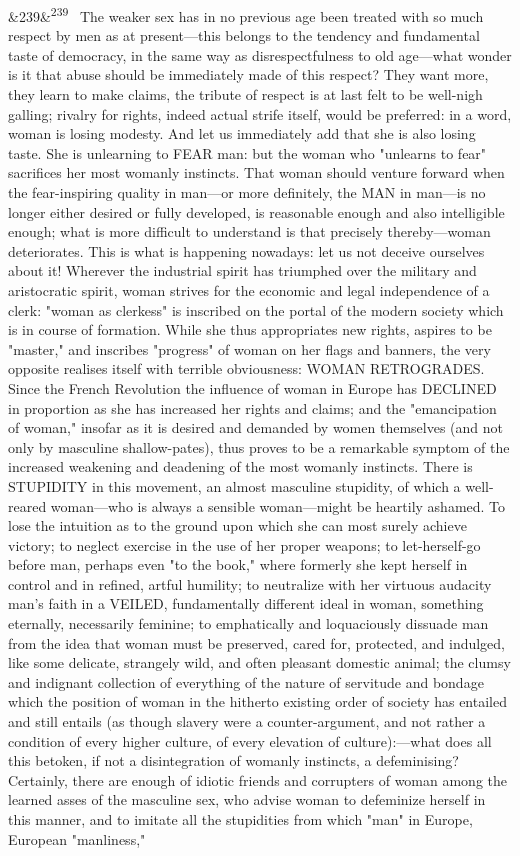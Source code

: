 \documentclass[12pt]{article}
\newcommand{\para}[1][]{\par\noindent\ifx&#1&\else\textsuperscript{\footnotesize #1}~\fi}
\begin{document}
\para[239] The weaker sex has in no previous age been treated with so much respect by men as at present---this belongs to the tendency and fundamental taste of democracy, in the same way as disrespectfulness to old age---what wonder is it that abuse should be immediately made of this respect? They want more, they learn to make claims, the tribute of respect is at last felt to be well-nigh galling; rivalry for rights, indeed actual strife itself, would be preferred: in a word, woman is losing modesty. And let us immediately add that she is also losing taste. She is unlearning to FEAR man: but the woman who "unlearns to fear" sacrifices her most womanly instincts. That woman should venture forward when the fear-inspiring quality in man---or more definitely, the MAN in man---is no longer either desired or fully developed, is reasonable enough and also intelligible enough; what is more difficult to understand is that precisely thereby---woman deteriorates. This is what is happening nowadays: let us not deceive ourselves about it! Wherever the industrial spirit has triumphed over the military and aristocratic spirit, woman strives for the economic and legal independence of a clerk: "woman as clerkess" is inscribed on the portal of the modern society which is in course of formation. While she thus appropriates new rights, aspires to be "master," and inscribes "progress" of woman on her flags and banners, the very opposite realises itself with terrible obviousness: WOMAN RETROGRADES. Since the French Revolution the influence of woman in Europe has DECLINED in proportion as she has increased her rights and claims; and the "emancipation of woman," insofar as it is desired and demanded by women themselves (and not only by masculine shallow-pates), thus proves to be a remarkable symptom of the increased weakening and deadening of the most womanly instincts. There is STUPIDITY in this movement, an almost masculine stupidity, of which a well-reared woman---who is always a sensible woman---might be heartily ashamed. To lose the intuition as to the ground upon which she can most surely achieve victory; to neglect exercise in the use of her proper weapons; to let-herself-go before man, perhaps even "to the book," where formerly she kept herself in control and in refined, artful humility; to neutralize with her virtuous audacity man's faith in a VEILED, fundamentally different ideal in woman, something eternally, necessarily feminine; to emphatically and loquaciously dissuade man from the idea that woman must be preserved, cared for, protected, and indulged, like some delicate, strangely wild, and often pleasant domestic animal; the clumsy and indignant collection of everything of the nature of servitude and bondage which the position of woman in the hitherto existing order of society has entailed and still entails (as though slavery were a counter-argument, and not rather a condition of every higher culture, of every elevation of culture):---what does all this betoken, if not a disintegration of womanly instincts, a defeminising? Certainly, there are enough of idiotic friends and corrupters of woman among the learned asses of the masculine sex, who advise woman to defeminize herself in this manner, and to imitate all the stupidities from which "man" in Europe, European "manliness," 
\end{document}
